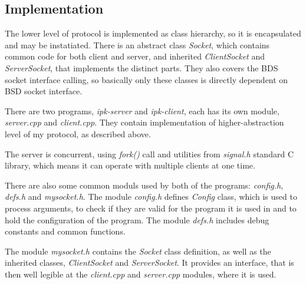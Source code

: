 \documentclass[10pt,a4paper,titlepage]{article}
\begin{document}
\subsection{Implementation}

The lower level of protocol is implemented as class hierarchy, so it is
encapsulated and may be instatiated. There is an abstract class {\it Socket},
which contains common code for both client and server, and inherited
{\it ClientSocket} and {\it ServerSocket}, that implements the distinct parts.
They also covers the BDS socket interface calling, so basically only these
classes is directly dependent on BSD socket interface.

There are two programs, {\it ipk-server} and {\it ipk-client}, each has its
own module, {\it server.cpp} and {\it client.cpp}. They contain implementation
of higher-abstraction level of my protocol, as described above.

The server is concurrent, using {\it fork()} call and utilities from
{\it signal.h} standard C library, which means it can operate with multiple
clients at one time.

There are also some common moduls used by both of the programs: {\it config.h},
{\it defs.h} and {\it mysocket.h}. The module {\it config.h} defines
{\it Config} class, which is used to process arguments, to check if they are
valid for the program it is used in and to hold the configuration of the program.
The module {\it defs.h} includes debug constants and common functions.

The module {\it mysocket.h} contains the {\it Socket} class definition, as well
as the inherited classes, {\it ClientSocket} and {\it ServerSocket}. It
provides an interface, that is then well legible at the {\it client.cpp}
and {\it server.cpp} modules, where it is used.
\end{document}
